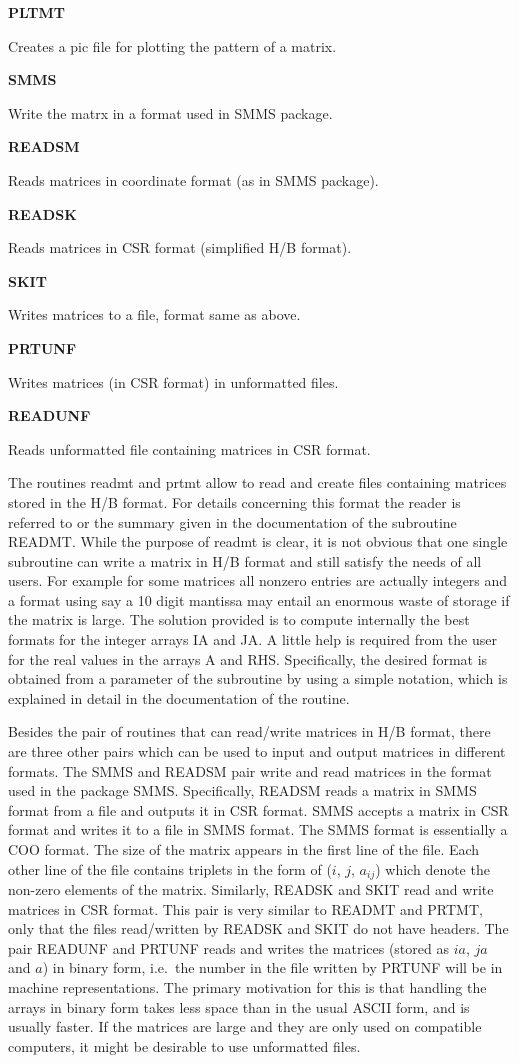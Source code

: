 \documentclass[12pt]{article}
\def\marg#1{\parbox[b]{1.3in}{\bf #1}}
\def\disp#1{\parbox[t]{4.62in}{#1} \vskip 0.2in }
\begin{document}
\marg{ PLTMT }\disp{Creates a pic file for plotting the pattern of a 
matrix.} 

\marg{ SMMS }\disp{Write the matrx in a format used in SMMS package.}

\marg{ READSM }\disp{Reads matrices in coordinate format (as in SMMS 
package).}

\marg{ READSK }\disp{Reads matrices in CSR format (simplified H/B format).}

\marg{ SKIT }\disp{Writes matrices to a file, format same as above.}

\marg{ PRTUNF }\disp{Writes matrices (in CSR format) in unformatted files.}

\marg{ READUNF }\disp{Reads unformatted file containing matrices in CSR format.}

 
\vskip 0.3in

The routines readmt and prtmt allow to read and create files
containing matrices stored in the H/B format. 
For details concerning this format the reader is referred to
\cite{Duff-HB} or the summary given in the documentation  of
the subroutine READMT. While the purpose of
readmt is clear, it is not obvious that one single 
subroutine can write a matrix in H/B format and still satisfy
the needs of all users. For example for some matrices all nonzero
entries are actually integers and a format using say a 10 digit
mantissa may entail an enormous waste of storage if the matrix
is large. The solution provided is to compute internally the best
formats for the integer arrays IA and JA. A little help is 
required from the user for the real values in the arrays A and
RHS. Specifically, the desired format is obtained from
a parameter of the subroutine by using a simple notation, 
which is explained in detail in the documentation of the routine. 

Besides the pair of routines that can read/write matrices in H/B
format, there are three other pairs which can be used to input and
output matrices in different formats. The SMMS and READSM pair write
and read matrices in the format used in the package SMMS.
Specifically, READSM reads a matrix in SMMS format from a file and outputs
it in CSR format. SMMS accepts a matrix in CSR format and
writes it to a file in SMMS format. The SMMS format is
essentially a COO format. 
The size of the matrix appears in the first line of the file. Each other
line of the file
contains triplets in the form of ($i$, $j$, $a_{ij}$) which
denote the non-zero elements of the matrix.
Similarly, READSK and SKIT read and write matrices in CSR format. 
This pair is very similar to READMT and PRTMT, only that the
files read/written by READSK and SKIT do not have headers. The pair 
READUNF and PRTUNF reads and writes the matrices (stored as $ia$, $ja$
and $a$) in binary form,
i.e.~the number in the file written by PRTUNF will be in machine
representations. The primary motivation for this is that
handling the arrays in binary form takes less space than in the
usual ASCII form, and is usually  faster.
If the matrices are large and they are only used on compatible computers,
it might be desirable to use unformatted files.
\end{document}
